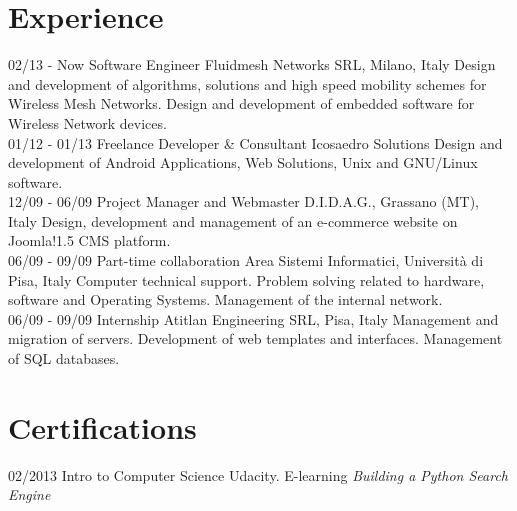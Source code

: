 \documentclass[]{friggeri-cv}
\begin{document}
\section{Experience}
\begin{entrylist}
  \entry
    {02/13 - Now}
    {Software Engineer}
    {Fluidmesh Networks SRL, Milano, Italy}
    {Design and development of algorithms, solutions and high speed mobility           schemes for Wireless Mesh Networks. Design and development of embedded software     for Wireless Network devices.\\}
  \entry
    {01/12 - 01/13}
    {Freelance Developer \& Consultant}
    {Icosaedro Solutions}
    {Design and development of Android Applications, Web Solutions, Unix and GNU/Linux software.\\}
    \entry
    {12/09 - 06/09}
    {Project Manager and Webmaster}
    {D.I.D.A.G., Grassano (MT), Italy}
    {Design, development and management of an e-commerce website on Joomla!1.5 CMS platform.\\}
    \entry
    {06/09 - 09/09}
    {Part-time collaboration}
    {Area Sistemi Informatici, Università di Pisa, Italy}
    {Computer technical support. Problem solving related to hardware, software and Operating Systems. Management of the internal network.\\}
    \entry
    {06/09 - 09/09}
    {Internship}
    {Atitlan Engineering SRL, Pisa, Italy}
    {Management and migration of servers. Development of web templates and interfaces. Management of SQL databases.}
\end{entrylist}



\section{Certifications}
\begin{entrylist}
  \entry
    {02/2013}
    {Intro to Computer Science}
    {Udacity. E-learning}
    {\emph{Building a Python Search Engine}}
\end{entrylist}

\newpage
\end{document}
